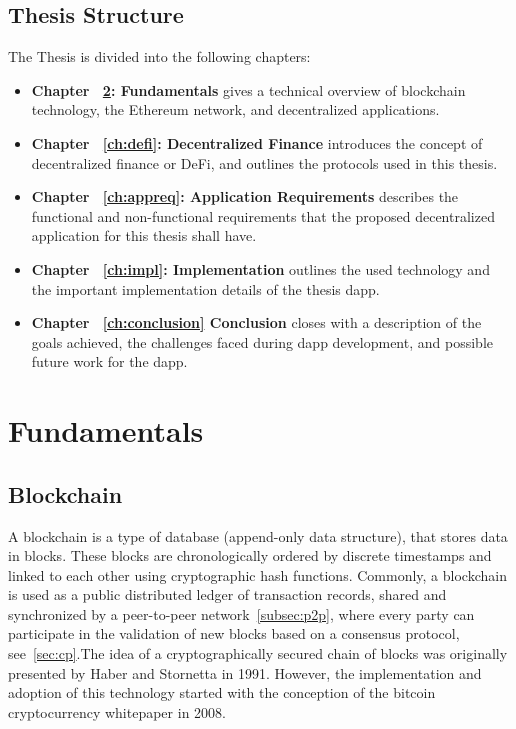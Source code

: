 \documentclass[11pt,a4paper]{report}
\begin{document}
\section{Thesis Structure}
The Thesis is divided into the following chapters:
\begin{itemize}
	
	\item \textbf{Chapter ~\ref{ch:background}: Fundamentals } gives a technical overview of blockchain technology, the Ethereum network, and decentralized applications.
	\item \textbf{Chapter ~\ref{ch:defi}: Decentralized Finance } introduces the concept of decentralized finance or DeFi, and outlines the protocols used in this thesis.
	\item \textbf{Chapter ~\ref{ch:appreq}: Application Requirements} describes the functional and non-functional requirements that the proposed decentralized application for this thesis shall have.
	\item \textbf{Chapter ~\ref{ch:impl}: Implementation} outlines the used technology and the important implementation details of the thesis dapp.
	\item \textbf{Chapter ~\ref{ch:conclusion} Conclusion}  closes with a description of the goals achieved, the challenges faced during dapp development, and possible future work for the dapp.
\end{itemize}


\chapter{Fundamentals} \label{ch:background}

\section{Blockchain} \label{sec:bc}
A blockchain\cite{book:bc}\cite{article:bc} is a type of database (append-only data structure), that stores data in blocks. These blocks are chronologically ordered by discrete timestamps and linked to each other using cryptographic hash functions. Commonly, a blockchain is used as a public distributed ledger of transaction records, shared and synchronized by a peer-to-peer network~\ref{subsec:p2p}, where every party can participate in the validation of new blocks based on a consensus protocol, see~\ref{sec:cp}.The idea of a cryptographically secured chain of blocks was originally presented by Haber and Stornetta\cite{time-stamp} in 1991. However, the implementation and adoption of this technology started with the conception of the bitcoin cryptocurrency whitepaper\cite{bitcoin} in 2008.
\end{document}
